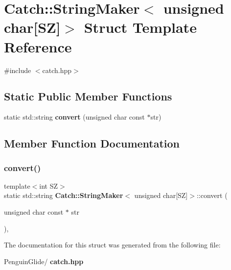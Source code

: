 \section{Catch\+::String\+Maker$<$ unsigned char[SZ]$>$ Struct Template Reference}
\label{struct_catch_1_1_string_maker_3_01unsigned_01char[_s_z]_4}


{\ttfamily \#include $<$catch.\+hpp$>$}

\subsection*{Static Public Member Functions}
\begin{DoxyCompactItemize}
\item 
static std\+::string \textbf{ convert} (unsigned char const $\ast$str)
\end{DoxyCompactItemize}


\subsection{Member Function Documentation}
\mbox{\label{struct_catch_1_1_string_maker_3_01unsigned_01char[_s_z]_4_a590d64c72b0cc75c113f1eea95d52b66}} 
\subsubsection{convert()}
{\footnotesize\ttfamily template$<$int SZ$>$ \\
static std\+::string \textbf{ Catch\+::\+String\+Maker}$<$ unsigned char[SZ]$>$\+::convert (\begin{DoxyParamCaption}\item[{unsigned char const $\ast$}]{str }\end{DoxyParamCaption})\hspace{0.3cm}{\ttfamily [inline]}, {\ttfamily [static]}}



The documentation for this struct was generated from the following file\+:\begin{DoxyCompactItemize}
\item 
Penguin\+Glide/\textbf{ catch.\+hpp}\end{DoxyCompactItemize}
